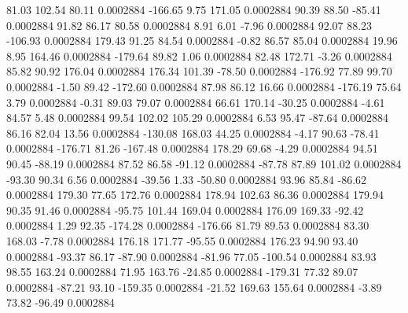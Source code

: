        81.03      102.54       80.11     0.0002884
     -166.65        9.75      171.05     0.0002884
       90.39       88.50      -85.41     0.0002884
       91.82       86.17       80.58     0.0002884
        8.91        6.01       -7.96     0.0002884
       92.07       88.23     -106.93     0.0002884
      179.43       91.25       84.54     0.0002884
       -0.82       86.57       85.04     0.0002884
       19.96        8.95      164.46     0.0002884
     -179.64       89.82        1.06     0.0002884
       82.48      172.71       -3.26     0.0002884
       85.82       90.92      176.04     0.0002884
      176.34      101.39      -78.50     0.0002884
     -176.92       77.89       99.70     0.0002884
       -1.50       89.42     -172.60     0.0002884
       87.98       86.12       16.66     0.0002884
     -176.19       75.64        3.79     0.0002884
       -0.31       89.03       79.07     0.0002884
       66.61      170.14      -30.25     0.0002884
       -4.61       84.57        5.48     0.0002884
       99.54      102.02      105.29     0.0002884
        6.53       95.47      -87.64     0.0002884
       86.16       82.04       13.56     0.0002884
     -130.08      168.03       44.25     0.0002884
       -4.17       90.63      -78.41     0.0002884
     -176.71       81.26     -167.48     0.0002884
      178.29       69.68       -4.29     0.0002884
       94.51       90.45      -88.19     0.0002884
       87.52       86.58      -91.12     0.0002884
      -87.78       87.89      101.02     0.0002884
      -93.30       90.34        6.56     0.0002884
      -39.56        1.33      -50.80     0.0002884
       93.96       85.84      -86.62     0.0002884
      179.30       77.65      172.76     0.0002884
      178.94      102.63       86.36     0.0002884
      179.94       90.35       91.46     0.0002884
      -95.75      101.44      169.04     0.0002884
      176.09      169.33      -92.42     0.0002884
        1.29       92.35     -174.28     0.0002884
     -176.66       81.79       89.53     0.0002884
       83.30      168.03       -7.78     0.0002884
      176.18      171.77      -95.55     0.0002884
      176.23       94.90       93.40     0.0002884
      -93.37       86.17      -87.90     0.0002884
      -81.96       77.05     -100.54     0.0002884
       83.93       98.55      163.24     0.0002884
       71.95      163.76      -24.85     0.0002884
     -179.31       77.32       89.07     0.0002884
      -87.21       93.10     -159.35     0.0002884
      -21.52      169.63      155.64     0.0002884
       -3.89       73.82      -96.49     0.0002884

